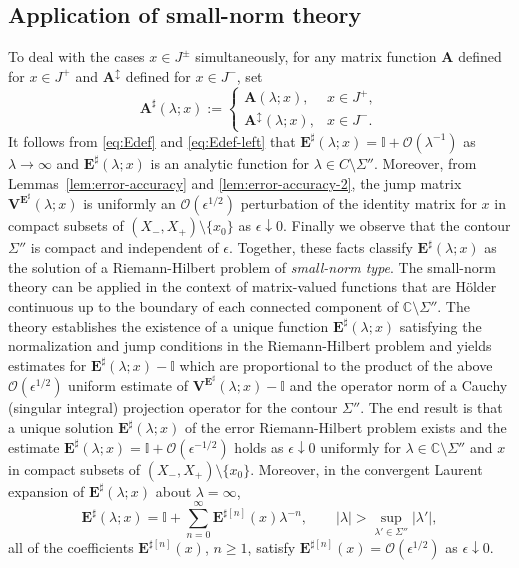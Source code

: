 \documentclass[12pt]{amsart}
\numberwithin{equation}{section}
\newcommand{\SP}{\lambda}
\newcommand{\C}{\mathbb{C}}
\newcommand{\eps}{\epsilon}
\newcommand{\bigo}[1]{ \mathcal{O}\! \left( #1 \right) }
\begin{document}
\subsection{Application of small-norm theory}
\label{sec-proof-Thm1}
To deal with the cases $x\in J^\pm$ simultaneously, for any matrix function $\mathbf{A}$ defined for $x \in J^+$ and $\mathbf{A}^\updownarrow$ defined for $x\in J^-$, set 
\begin{equation}
	\mathbf{A}^\sharp(\SP;x) := \begin{cases}
		\mathbf{A}(\SP;x), & x \in J^+, \\
		\mathbf{A}^\updownarrow(\SP;x),& x \in J^- .
	\end{cases}
\end{equation}
It follows from  \eqref{eq:Edef} and \eqref{eq:Edef-left} that $\mathbf{E}^\sharp(\SP;x) = \mathbb{I} + \bigo{\SP^{-1}}$ as $\SP \to \infty$ and $\mathbf{E}^\sharp(\SP;x)$ is an analytic function for $\SP \in C \setminus \Sigma''$. 
Moreover, from Lemmas~\ref{lem:error-accuracy} and \ref{lem:error-accuracy-2}, the jump matrix $\mathbf{V}^{\mathbf{E}^\sharp}(\SP;x)$ is uniformly an $\bigo{\eps^{1/2}}$ perturbation of the identity matrix for $x$ in compact subsets of $(X_-,X_+) \setminus \{ x_0 \}$ as $\eps \downarrow 0$. 
Finally we observe that the contour $\Sigma''$ is compact and independent of $\eps$.
Together, these facts classify $\mathbf{E}^\sharp(\SP;x)$ as the solution of a Riemann-Hilbert problem of \emph{small-norm type}.  The small-norm theory can be applied in the context of matrix-valued functions that are H\"older continuous up to the boundary of each connected component of $\C \setminus \Sigma''$. The theory establishes the existence of a unique function $\mathbf{E}^\sharp(\SP;x)$ satisfying the normalization and jump conditions in the Riemann-Hilbert problem and yields estimates for $\mathbf{E}^\sharp(\SP;x)-\mathbb{I}$ which are proportional to the product of the above $\bigo{\eps^{1/2}}$ uniform estimate of $\mathbf{V}^{\mathbf{E}^\sharp}(\SP;x) - \mathbb{I}$ and the operator norm of a Cauchy (singular integral) projection operator for the contour $\Sigma''$.  The end result is that a unique solution $\mathbf{E}^\sharp(\SP;x)$ of the error Riemann-Hilbert problem exists and the estimate $\mathbf{E}^\sharp(\SP;x) = \mathbb{I} + \bigo{\eps^{-1/2}}$ holds as $\eps \downarrow 0$ uniformly for $\SP \in \C \setminus \Sigma''$ and $x$ in compact subsets of $(X_-,X_+) \setminus \{ x_0 \}$. Moreover, in the convergent Laurent expansion of $\mathbf{E}^\sharp(\SP;x)$ about $\SP = \infty$,
\begin{equation}
	\mathbf{E}^\sharp(\SP;x) = \mathbb{I} + \sum_{n=0}^\infty \mathbf{E}^{\sharp[n]}(x) \SP^{-n},  \qquad |\SP| > \sup_{\SP' \in \Sigma''} | \SP'|,
	\label{eq:error.matrix.expand}
\end{equation}
all of the coefficients $\mathbf{E}^{\sharp[n]}(x)$, $n \geq 1$, satisfy $\mathbf{E}^{\sharp[n]}(x) = \bigo{\eps^{1/2}}$ as $\eps \downarrow 0$. 
\end{document}
